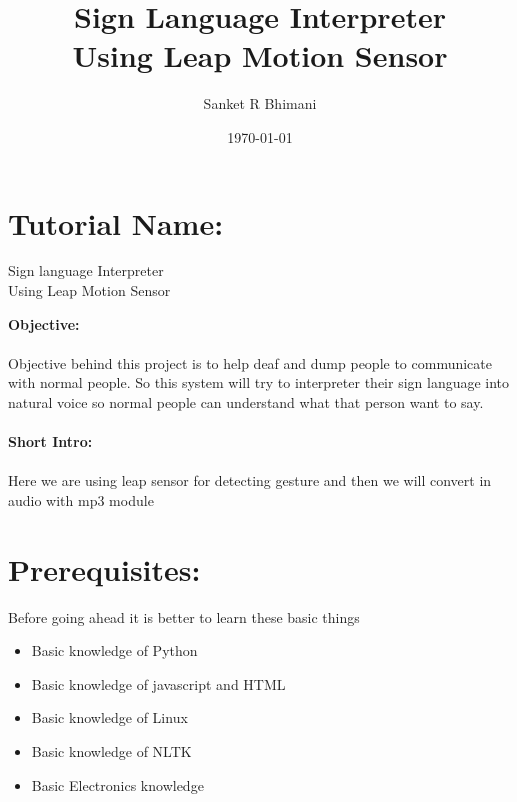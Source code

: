 \documentclass[11pt,a4paper]{article}
\title{\textbf{\Huge{Sign Language Interpreter}}\vspace{6mm}\\Using Leap Motion Sensor}
\author{Sanket R Bhimani}
\date{\today}
\newcommand\tab[1][1cm]{\hspace*{#1}}
\begin{document}
	\maketitle
	\newpage
	\tableofcontents
	\newpage
	\section{Tutorial Name:}
	\begin{center}\huge{Sign language Interpreter}\\\Large{Using Leap Motion Sensor}\end{center}
	\vspace{15mm}
	\textbf{\Large{Objective:}}\\
	\vspace{1mm}\\
	Objective behind this project is to help deaf and dump people to communicate with normal people. So this system will try to interpreter their sign language into natural voice so normal people can understand what that person want to say.\\
	\vspace{6mm}\\
	\textbf{\Large{Short Intro:}}\\
	\vspace{1mm}\\
	Here we are using leap sensor for detecting gesture and then we will convert in audio with mp3 module
	\newpage
	\section{Prerequisites:}
	\vspace{1cm}
	\tab Before going ahead it is better to learn these basic things
    \vspace{1cm}
	\begin{itemize}
	    \item Basic knowledge of Python
	    \item Basic knowledge of javascript and HTML
	    \item Basic knowledge of Linux
	    \item Basic knowledge of NLTK
	    \item Basic Electronics knowledge
	\end{itemize}
	\newpage
\end{document}
